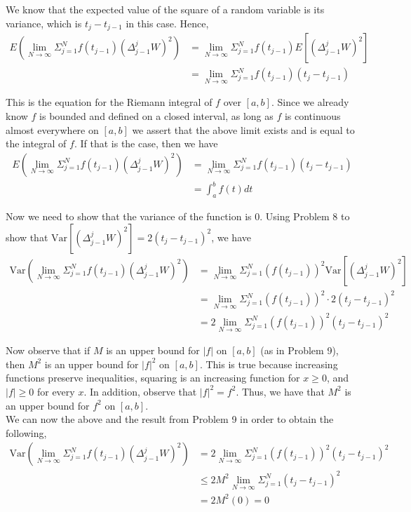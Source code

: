 \documentclass[12pt]{article}
\begin{document}
We know that the expected value of the square of a random variable is its variance, which is $t_j - t_{j-1}$ in this case. Hence,
\begin{align*}
E(\lim_{N \to \infty} \Sigma^N_{j=1} f(t_{j-1}) (\Delta_{j-1}^j W)^2) &= \lim_{N \to \infty} \Sigma^N_{j=1} f(t_{j-1}) E[(\Delta_{j-1}^j W)^2]\\
&= \lim_{N \to \infty} \Sigma^N_{j=1} f(t_{j-1})(t_j - t_{j-1})
\end{align*}

This is the equation for the Riemann integral of $f$ over $[a,b]$. Since we already know $f$ is bounded and defined on a closed interval, as long as $f$ is continuous almost everywhere on $[a,b]$ we assert that the above limit exists and is equal to the integral of $f$. If that is the case, then we have
\begin{align*}
E(\lim_{N \to \infty} \Sigma^N_{j=1} f(t_{j-1}) (\Delta_{j-1}^j W)^2) &= \lim_{N \to \infty} \Sigma^N_{j=1} f(t_{j-1})(t_j - t_{j-1})\\
&= \int_a^b f(t) dt
\end{align*}

Now we need to show that the variance of the function is 0. Using Problem 8 to show that $\text{Var}[(\Delta_{j-1}^j W)^2] = 2(t_j - t_{j-1})^2$, we have
\begin{align*}
\text{Var}(\lim_{N \to \infty} \Sigma^N_{j=1} f(t_{j-1}) (\Delta_{j-1}^j W)^2) &= \lim_{N \to \infty} \Sigma^N_{j=1} (f(t_{j-1}))^2 \text{Var}[(\Delta_{j-1}^j W)^2]\\
&= \lim_{N \to \infty} \Sigma^N_{j=1} (f(t_{j-1}))^2 \cdot 2(t_j - t_{j-1})^2\\
&= 2\lim_{N \to \infty} \Sigma^N_{j=1} (f(t_{j-1}))^2 (t_j - t_{j-1})^2
\end{align*}

Now observe that if $M$ is an upper bound for $|f|$ on $[a,b]$ (as in Problem 9), then $M^2$ is an upper bound for $|f|^2$ on $[a,b]$. This is true because increasing functions preserve inequalities, squaring is an increasing function for $x \geq 0$, and $|f| \geq 0$ for every $x$. In addition, observe that $|f|^2 = f^2$. Thus, we have that $M^2$ is an upper bound for $f^2$ on $[a,b]$.\\

We can now the above and the result from Problem 9 in order to obtain the following,
\begin{align*}
\text{Var}(\lim_{N \to \infty} \Sigma^N_{j=1} f(t_{j-1}) (\Delta_{j-1}^j W)^2) &= 2\lim_{N \to \infty} \Sigma^N_{j=1} (f(t_{j-1}))^2 (t_j - t_{j-1})^2\\
&\leq 2M^2 \lim_{N \to \infty} \Sigma^N_{j=1} (t_j - t_{j-1})^2\\
&= 2M^2(0) = 0
\end{align*}
\end{document}
